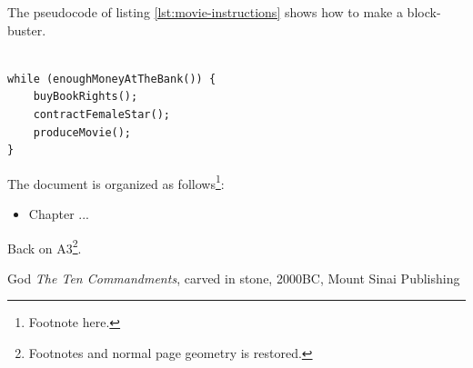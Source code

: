 \documentclass[11pt,twoside,a4paper,pagesize]{report}
\begin{document}
The pseudocode of listing \ref{lst:movie-instructions} shows how to
make a block-buster.

\lstset{language=Java}
\begin{lstlisting}[float, frame=single, caption=How to make a block-buster, label=lst:movie-instructions]

while (enoughMoneyAtTheBank()) {
    buyBookRights();
    contractFemaleStar();
    produceMovie();
}
\end{lstlisting}


\clearpage

The document is organized as follows\footnote{Footnote here.}:
\begin{itemize}
\item Chapter ... 
\end{itemize}


\clearpage
Back on A3\footnote{Footnotes and normal page geometry is restored.}.



\renewcommand{\bibname}{References}

\begin{thebibliography}{1}
    God {\em The Ten Commandments}, carved in stone, 2000BC, Mount Sinai Publishing
\end{thebibliography}
\end{document}
